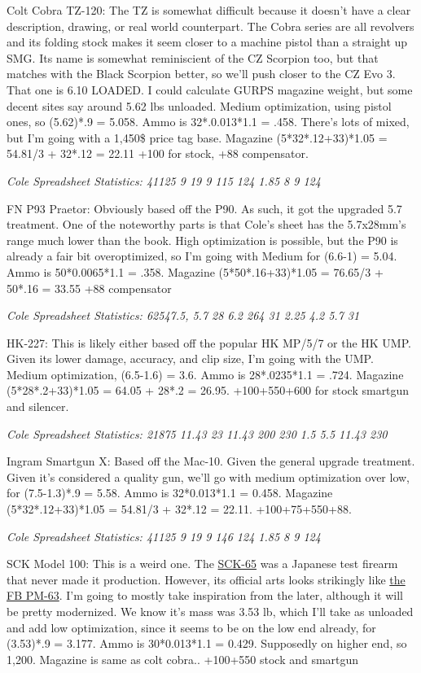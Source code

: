 \begin{multicols*}{2}
	Colt Cobra TZ-120: The TZ is somewhat difficult because it doesn't have a clear description, drawing, or real world counterpart. The Cobra series are all revolvers and its folding stock makes it seem closer to a machine pistol than a straight up SMG. Its name is somewhat reminiscient of the CZ Scorpion too, but that matches with the Black Scorpion better, so we'll push closer to the CZ Evo 3. That one is 6.10 LOADED. I could calculate GURPS magazine weight, but some decent sites say around 5.62 lbs unloaded. Medium optimization, using pistol ones, so (5.62)*.9 = 5.058. Ammo is 32*.0.013*1.1 = .458. There's lots of mixed, but I'm going with a 1,450\$ price tag base. Magazine (5*32*.12+33)*1.05 = 54.81/3 + 32*.12 = 22.11 +100 for stock, +88 compensator.
	
	\textit{\textcolor{OliveGreen}{Cole Spreadsheet Statistics: 41125 9 19 9 115 124 1.85 8 9 124 }}
	
	FN P93 Praetor: Obviously based off the P90. As such, it got the upgraded 5.7 treatment. One of the noteworthy parts is that Cole's sheet has the 5.7x28mm's range much lower than the book. High optimization is possible, but the P90 is already a fair bit overoptimized, so I'm going with Medium for (6.6-1) = 5.04. Ammo is 50*0.0065*1.1 = .358. Magazine (5*50*.16+33)*1.05 = 76.65/3 + 50*.16 = 33.55 +88 compensator
	
	\textit{\textcolor{OliveGreen}{Cole Spreadsheet Statistics:  62547.5, 5.7 28 6.2 264 31 2.25 4.2 5.7 31}}
	
	HK-227: This is likely either based off the popular HK MP/5/7 or the HK UMP. Given its lower damage, accuracy, and clip size, I'm going with the UMP. Medium optimization, (6.5-1.6) = 3.6. Ammo is 28*.0235*1.1 = .724. Magazine (5*28*.2+33)*1.05 = 64.05 + 28*.2 = 26.95. +100+550+600 for stock smartgun and silencer.
	
	\textit{\textcolor{OliveGreen}{Cole Spreadsheet Statistics: 21875 11.43 23 11.43 200 230 1.5 5.5 11.43 230}}
	
	Ingram Smartgun X: Based off the Mac-10. Given the general upgrade treatment. Given it's considered a quality gun, we'll go with medium optimization over low, for (7.5-1.3)*.9 = 5.58. Ammo is 32*0.013*1.1 = 0.458. Magazine (5*32*.12+33)*1.05 = 54.81/3 + 32*.12 = 22.11. +100+75+550+88.
	
	\textit{\textcolor{OliveGreen}{Cole Spreadsheet Statistics: 41125 9 19 9 146 124 1.85 8 9 124}}
	
	SCK Model 100: This is a weird one. The \textcolor{Blue}{\href{https://en.wikipedia.org/wiki/New_Nambu_M66}{SCK-65}} was a Japanese test firearm that never made it production. However, its official arts looks strikingly like \textcolor{Blue}{\href{https://en.wikipedia.org/wiki/FB_PM-63}{the FB PM-63}}. I'm going to mostly take inspiration from the later, although it will be pretty modernized. We know it's mass was 3.53 lb, which I'll take as unloaded and add low optimization, since it seems to be on the low end already, for (3.53)*.9 = 3.177. Ammo is 30*0.013*1.1 = 0.429. Supposedly on higher end, so 1,200. Magazine is same as colt cobra.. +100+550 stock and smartgun
	

\end{multicols*}

